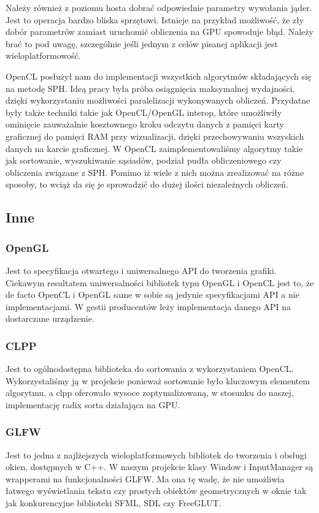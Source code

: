 \documentclass[polish, 12pt]{aghthesis}
\begin{document}
			Należy również z poziomu hosta dobrać odpowiednie parametry wywołania jąder. Jest to operacja bardzo bliska sprzętowi. Istnieje na przykład możliwość, że zły dobór parametrów zamiast uruchomić obliczenia na GPU spowoduje błąd. Należy brać to pod uwagę, szczególnie jeśli jednym z celów pisanej aplikacji jest wieloplatformowość.
			
			OpenCL posłużył nam do implementacji wszystkich algorytmów składających się na metodę SPH. Ideą pracy była próba osiągnięcia maksymalnej wydajności, dzięki wykorzystaniu możliwości paralelizacji wykonywanych obliczeń. Przydatne były także techniki takie jak OpenCL/OpenGL interop, które umożliwiły ominięcie zauważalnie kosztownego kroku odczytu danych z pamięci karty graficznej do pamięci RAM przy wizualizacji, dzięki przechowywaniu wszyskich danych na karcie graficznej. W OpenCL zaimplementowaliśmy algorytmy takie jak sortowanie, wyszukiwanie sąsiadów, podział pudła obliczeniowego czy obliczenia związane z SPH. Pomimo iż wiele z nich można zrealizować na różne sposoby, to wciąż da się je sprowadzić do dużej ilości niezależnych obliczeń.
			
\subsection{Inne}

	\subsubsection*{OpenGL}
			Jest to specyfikacja otwartego i uniwersalnego API do tworzenia grafiki. Ciekawym resultatem uniwersalności bibliotek typu OpenGL i OpenCL jest to, że de facto OpenCL i OpenGL same w sobie są jedynie specyfikacjami API a nie implementacjami. W gestii producentów leży implementacja danego API na dostarczane urządzenie.

\subsubsection*{CLPP}
			 Jest to ogólnodostępna biblioteka do sortowania z wykorzystaniem OpenCL. Wykorzystaliśmy ją w projekcie ponieważ sortowanie było kluczowym elementem algorytmu, a clpp oferowało wysoce zoptymalizowaną, w stosunku do naszej, implementację radix sorta działająca na GPU.

\subsubsection*{GLFW}
			 Jest to jedna z najlżejszych wieloplatformowych bibliotek do tworzenia i obsługi okien, dostępnych w C++. W naszym projekcie klasy Window i InputManager są wrapperami na funkcjonalności GLFW. Ma ona tę wadę, że nie umożliwia łatwego wyświetlania tekstu czy prostych obiektów geometrycznych w oknie tak jak konkurencyjne biblioteki SFML, SDL czy FreeGLUT. 
\end{document}
